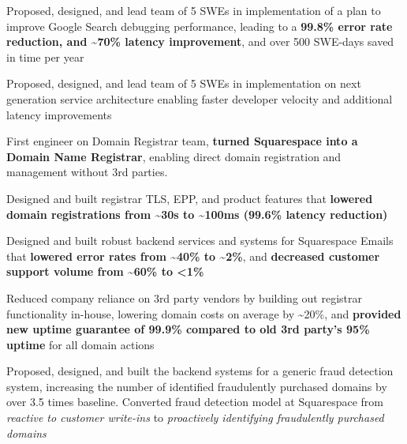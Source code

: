 \documentclass[]{two-column-resume}
\begin{document}
\begin{minipage}[t]{0.65\textwidth}
        \vspace{\topsep} %
        \begin{tightemize}
                            \item Proposed, designed, and lead team of 5 SWEs in implementation of a plan to improve Google Search debugging performance, leading to a \textbf{99.8\% error rate reduction, and \textasciitilde70\% latency improvement}, and over 500 SWE-days saved in time per year
                            \item Proposed, designed, and lead team of 5 SWEs in implementation on next generation service architecture enabling faster developer velocity and additional latency improvements
                    \end{tightemize}
        \sectionsep
        \vspace{\topsep} %
        \begin{tightemize}
                            \item First engineer on Domain Registrar team, \textbf{turned Squarespace into a Domain Name Registrar}, enabling direct domain registration and management without 3rd parties.
                            \item Designed and built registrar TLS, EPP, and product features that \textbf{lowered domain registrations from \textasciitilde30s to \textasciitilde100ms (99.6\% latency reduction)}
                            \item Designed and built robust backend services and systems for Squarespace Emails that \textbf{lowered error rates from \textasciitilde40\% to \textasciitilde2\%}, and \textbf{decreased customer support volume from \textasciitilde60\% to <1\%}
                            \item Reduced company reliance on 3rd party vendors by building out registrar functionality in-house, lowering domain costs on average by \textasciitilde20\%, and \textbf{provided new uptime guarantee of 99.9\% compared to old 3rd party's 95\% uptime} for all domain actions
                            \item Proposed, designed, and built the backend systems for a generic fraud detection system, increasing the number of identified fraudulently purchased domains by over 3.5 times baseline. Converted fraud detection model at Squarespace from \textit{reactive to customer write-ins} to \textit{proactively identifying fraudulently purchased domains}

\end{tightemize}
\end{minipage}
\end{document}
